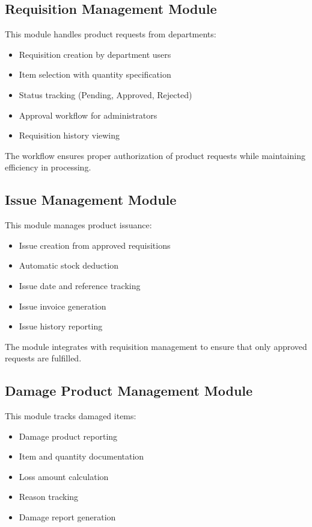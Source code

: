 \subsection{Requisition Management Module}

This module handles product requests from departments:

\begin{itemize}
    \item Requisition creation by department users
    \item Item selection with quantity specification
    \item Status tracking (Pending, Approved, Rejected)
    \item Approval workflow for administrators
    \item Requisition history viewing
\end{itemize}

The workflow ensures proper authorization of product requests while maintaining efficiency in processing.

\subsection{Issue Management Module}

This module manages product issuance:

\begin{itemize}
    \item Issue creation from approved requisitions
    \item Automatic stock deduction
    \item Issue date and reference tracking
    \item Issue invoice generation
    \item Issue history reporting
\end{itemize}

The module integrates with requisition management to ensure that only approved requests are fulfilled.

\subsection{Damage Product Management Module}

This module tracks damaged items:

\begin{itemize}
    \item Damage product reporting
    \item Item and quantity documentation
    \item Loss amount calculation
    \item Reason tracking
    \item Damage report generation
\end{itemize}

